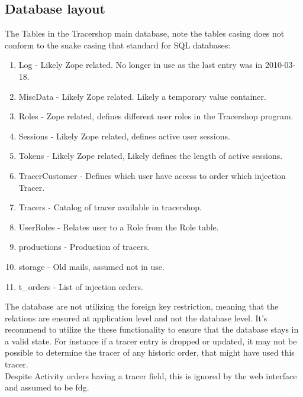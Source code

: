 \documentclass{article}
\begin{document}
\subsection*{Database layout}
The Tables in the Tracershop main database, note the tables casing does not conform to the snake casing that standard for SQL databases:
\begin{enumerate}
  \item Log - Likely Zope related. No longer in use as the last entry was in 2010-03-18.
  \item MiscData - Likely Zope related. Likely a temporary value container.
  \item Roles - Zope related, defines different user roles in the Tracershop program.
  \item Sessions - Likely Zope related, defines active user sessions.
  \item Tokens - Likely Zope related, Likely defines the length of active sessions.
  \item TracerCustomer - Defines which user have access to order which injection Tracer.
  \item Tracers - Catalog of tracer available in tracershop.
  \item UserRoles - Relates user to a Role from the Role table.
  \item productions - Production of tracers.
  \item storage - Old mails, assumed not in use.
  \item t\_orders - List of injection orders.
\end{enumerate}
The database are not utilizing the foreign key restriction, meaning that the relations are ensured at application level and not the database level.
It's recommend to utilize the these functionality to ensure that the database stays in a valid state.
For instance if a tracer entry is dropped or updated, it may not be possible to determine the tracer of any historic order, that might have used this tracer.\\
Despite Activity orders having a tracer field, this is ignored by the web interface and assumed to be \Gls{fdg}.
\end{document}
